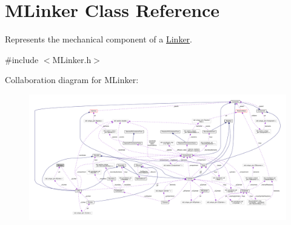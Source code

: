 \hypertarget{classMLinker}{\section{M\+Linker Class Reference}
\label{classMLinker}
}


Represents the mechanical component of a \hyperlink{classLinker}{Linker}.  




{\ttfamily \#include $<$M\+Linker.\+h$>$}



Collaboration diagram for M\+Linker\+:\nopagebreak
\begin{figure}[H]
\begin{center}
\leavevmode
\includegraphics[width=350pt]{classMLinker__coll__graph}
\end{center}
\end{figure}
